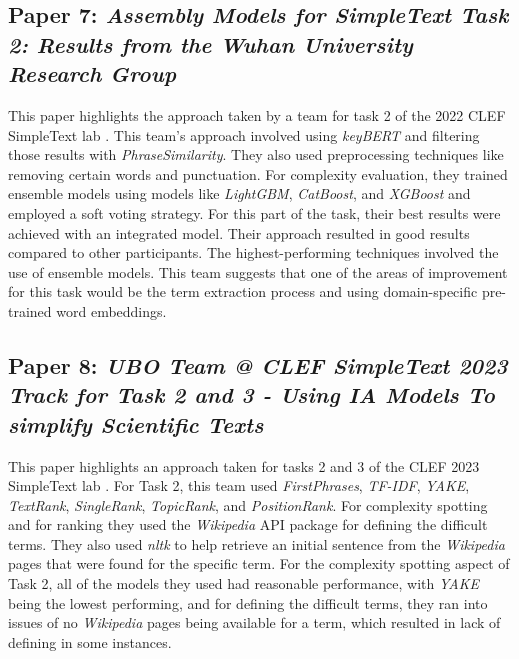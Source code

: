 \documentclass[runningheads]{llncs}
\begin{document}
\subsection{Paper 7: \textit{Assembly Models for SimpleText Task 2: Results from the Wuhan University Research Group}}
This paper highlights the approach taken by a team for task 2 of the 2022 CLEF SimpleText lab \cite{Paper 7}. This team’s approach involved using \textit{keyBERT} and filtering those results with \textit{PhraseSimilarity}. They also used preprocessing techniques like removing certain words and punctuation. For complexity evaluation, they trained ensemble models using models like \textit{LightGBM}, \textit{CatBoost}, and \textit{XGBoost} and employed a soft voting strategy. For this part of the task, their best results were achieved with an integrated model. Their approach resulted in good results compared to other participants. The highest-performing techniques involved the use of ensemble models. This team suggests that one of the areas of improvement for this task would be the term extraction process and using domain-specific pre-trained word embeddings. 

\subsection{Paper 8: \textit{UBO Team @ CLEF SimpleText 2023 Track for Task 2 and 3 - Using \textit{IA} Models To simplify Scientific Texts}}
This paper highlights an approach taken for tasks 2 and 3 of the CLEF 2023 SimpleText lab \cite{Paper 8}. For Task 2, this team used \textit{FirstPhrases}, \textit{TF-IDF}, \textit{YAKE}, \textit{TextRank}, \textit{SingleRank}, \textit{TopicRank}, and \textit{PositionRank}. For complexity spotting and for ranking they used the \textit{Wikipedia} API package for defining the difficult terms. They also used \textit{nltk} to help retrieve an initial sentence from the \textit{Wikipedia} pages that were found for the specific term. For the complexity spotting aspect of Task 2, all of the models they used had reasonable performance, with \textit{YAKE} being the lowest performing, and for defining the difficult terms, they ran into issues of no \textit{Wikipedia} pages being available for a term, which resulted in lack of defining in some instances. 
\end{document}

